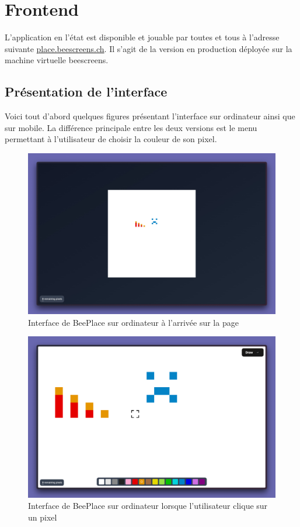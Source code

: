 \section{Frontend}

L'application en l'état est disponible et jouable par toutes et tous à l'adresse suivante \href{https://place.beescreens.ch}{place.beescreens.ch}. Il s'agit de la version en production déployée sur la machine virtuelle \gls{beescreens}.

\subsection{Présentation de l'interface}

Voici tout d'abord quelques figures présentant l'interface sur ordinateur ainsi que sur mobile. La différence principale entre les deux versions est le menu permettant à l'utilisateur de choisir la couleur de son pixel.


\begin{figure}[H]
  \centering
  \includegraphics[width=1\textwidth]{./assets/figures/screenshot-app-1.jpeg}
  \caption{Interface de BeePlace sur ordinateur à l'arrivée sur la page}
  \label{fig:screenshot-app-1}
\end{figure}

\begin{figure}[H]
  \centering
  \includegraphics[width=1\textwidth]{./assets/figures/screenshot-app-2.png}
  \caption{Interface de BeePlace sur ordinateur lorsque l'utilisateur clique sur un pixel}
  \label{fig:screenshot-app-2}
\end{figure}

